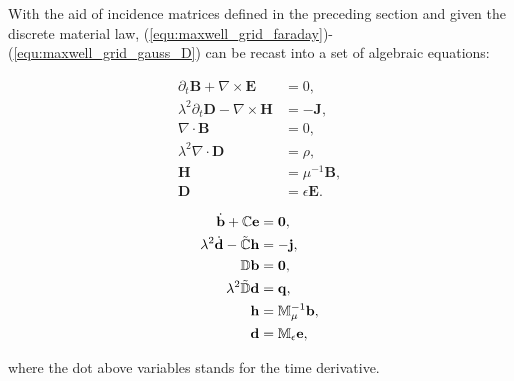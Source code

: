 \documentclass{article}
\begin{document}
With the aid of incidence matrices defined in the preceding section and given the discrete material law, (\ref{equ:maxwell_grid_faraday})-(\ref{equ:maxwell_grid_gauss_D}) can be recast into a set of algebraic equations:
\begin{center}
\vspace{-0.5cm}
\begin{minipage}{0.3\textwidth}
\begin{align*}
    \partial_t \mathbf{B} + \nabla \times \mathbf{E} &= 0, \\
    \lambda^2\partial_t \mathbf{D} - \nabla \times \mathbf{H} &= -\mathbf{J}, \\
    \nabla \cdot \mathbf{B} &= 0,  \\
    \lambda^2\nabla \cdot \mathbf{D} &= \rho, \\
    \mathbf{H} &= \mu^{-1} \mathbf{B}, \\
    \mathbf{D} &= \epsilon \mathbf{E}. 
\end{align*}
\end{minipage}
\begin{minipage}{0.1\textwidth}
\centering
{}
\end{minipage}
\begin{minipage}{0.3\textwidth}
\begin{subequations}
\begin{align}
    \dot{\mathbf{b}} + \mathbb{C}\mathbf{e} &= \mathbf{0} , \label{equ:alg_faraday}\\
    \lambda^2\dot{\mathbf{d}} - \Tilde{\mathbb{C}}\mathbf{h} &= - \mathbf{j}, \label{equ:alg_empere}\\
    \mathbb{D}\mathbf{b} &= \mathbf{0},  \label{equ:alg_gauss_b}\\
    \lambda^2\Tilde{\mathbb{D}}\mathbf{d} &= \mathbf{q},  \label{equ:alg_gauss_d}\\
    \mathbf{h} &= \mathbb{M}_\mu^{-1} \mathbf{b}, \label{equ:alg_material_magnetic}\\
    \mathbf{d} &= \mathbb{M}_{\epsilon} \mathbf{e}, \label{equ:alg_material_electric} 
\end{align}
\end{subequations}
\end{minipage}
\end{center}
where the dot above variables stands for the time derivative.
\end{document}
